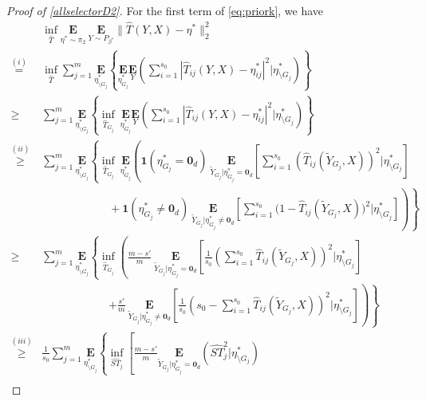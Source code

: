 \documentclass[12pt]{article}
\newtheorem{proof}{Proof}
\begin{document}
\begin{appendix}
\begin{proof}[Proof of \eqref{allselectorD2}]
For the first term of \eqref{eq:priork}, we have
\begin{align*}
& \inf_{\hat T }\underset{\eta^* \sim \pi_2}{\mathbf E}~
    \underset{Y \sim P_{\beta^*} }{\mathbf E} \|\hat T(Y,X) - \eta^* \|_2^2\\
\overset{(i)}=&\inf_{\hat T } \sum_{j=1}^m \underset{\eta_{\setminus G_j}^*}{\mathbf E}  \left\{
    \underset{\eta_{G_j}^*}{\mathbf E}\underset{Y }{\mathbf E} \left( \sum_{i=1}^{s_0} |\hat T_{ij}(Y,X) - \eta_{ij}^*|^2 \Big| \eta_{\setminus G_j}^* \right) \right\}\\ 
\ge &\sum_{j=1}^m \underset{\eta_{\setminus G_j}^* }{\mathbf E}  \left\{ \inf_{\hat T_{G_j} }~
    \underset{\eta_{G_j}^* }{\mathbf E}\underset{Y }{\mathbf E} \left( \sum_{i=1}^{s_0} |\hat T_{ij}(Y,X) - \eta_{ij}^*|^2 \Big| \eta_{\setminus G_j}^* \right) \right\}\\ 
\overset{(ii)}{\ge}& \sum_{j=1}^m \underset{\eta_{\setminus G_j }^*}{\mathbf E}
    \left\{ \inf_{\hat T_{G_j}}~ \underset{\eta_{G_j}^* }{\mathbf E} 
    \left( \mathbf1(\eta_{G_j}^* =\mathbf0_d )~ \underset{\tilde Y_{G_j}|\eta_{G_j}^* =\mathbf0_d}{\mathbf E}
    \left[ \sum_{i=1}^{s_0} (\hat T_{ij}(\tilde Y_{G_j} , X))^2
    \Big | \eta_{\setminus G_j}^* \right] \right.\right.\\
    &\qquad\qquad\qquad + \left.\left. \mathbf1(\eta_{G_j}^* \ne \mathbf 0_d)~ \underset{\tilde Y_{G_j}|\eta_{G_j}^* \ne \mathbf0_d}{\mathbf E}
    \left[\sum_{i=1}^{s_0}\big(1-\hat T_{ij}(\tilde Y_{G_j} ,X)\big)^2
    \Big| \eta_{\setminus G_j}^* \right] \right) \right\} \\ 
\ge & \sum_{j=1}^m \underset{\eta_{\setminus G_j}^* }{\mathbf E}  
    \left\{ \inf_{\hat T_{G_j}} \left( \frac{m-s'}{m}~
    \underset{ \tilde Y_{G_j} |\eta_{G_j}^* =\mathbf0_d}{\mathbf E} \left[ 
    \frac{1}{s_0} \left(\sum_{i=1}^{s_0} \hat T_{ij}(\tilde Y_{G_j},X)\right)^2 
    \Big|\eta_{\setminus G_j}^* \right] \right.\right.\\
    &\qquad\qquad\qquad \left.\left.+ \frac{s'}{m}~\underset{\tilde Y_{G_j} |\eta_{G_j}^* \ne \mathbf0_d}{\mathbf E}
    \left[  \frac{1}{s_0} \left( s_0 -\sum_{i=1}^{s_0} \hat T_{ij}(\tilde Y_{G_j},X) \right)^2  \Big| \eta_{\setminus G_j}^* \right]  \right) \right\}\\ 
\overset{(iii)}{\ge} & \frac{1}{s_0} \sum_{j=1}^m \underset{\eta_{\setminus G_j}^* }{\mathbf E}  
    \left\{ \inf_{\widehat{ST}_{j}} \left[ \frac{m-s'}{m}
    \underset{\tilde Y_{G_j}|\eta_{G_j}^* =\mathbf0_d}{\mathbf E} \left(
    \widehat{ST}_{j}^2 \Big| \eta_{\setminus G_j}^*  \right)  \right.\right. \\

\end{align*}
\end{proof}
\end{appendix}
\end{document}
